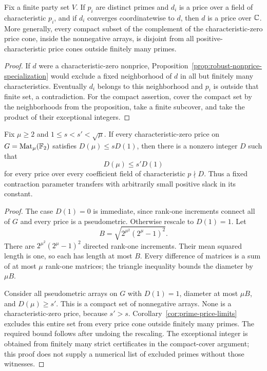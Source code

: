 \begin{corollary}
\label{cor:prime-price-limits}
Fix a finite party set $V$. If $p_i$ are distinct primes and
$d_i$ is a price over a field of characteristic $p_i$, and if
$d_i$ converges coordinatewise to $d$, then $d$ is a price over
$\mathbb C$. More generally, every compact subset of the complement of
the characteristic-zero price cone, inside the nonnegative arrays,
is disjoint from all positive-characteristic price cones outside
finitely many primes.
\end{corollary}

\begin{proof}
If $d$ were a characteristic-zero nonprice,
Proposition~\ref{prop:robust-nonprice-specialization} would exclude
a fixed neighborhood of $d$ in all but finitely many
characteristics. Eventually $d_i$ belongs to this neighborhood
and $p_i$ is outside that finite set, a contradiction.
For the compact assertion, cover the compact set by the
neighborhoods from the proposition, take a finite subcover,
and take the product of their exceptional integers.
\end{proof}

\begin{corollary}
\label{cor:contraction-specializes}
Fix $\mu\ge2$ and $1\le s<s'<\sqrt\mu$.
If every characteristic-zero price on
$G=\operatorname{Mat}_{\mu}(\mathbb F_2)$ satisfies
$D(\mu)\le sD(1)$, then there is a nonzero integer $D$ such that
\[
 D(\mu)\le s'D(1)
\]
for every price over every coefficient field of characteristic
$p\nmid D$. Thus a fixed contraction parameter transfers with
arbitrarily small positive slack in its constant.
\end{corollary}

\begin{proof}
The case $D(1)=0$ is immediate, since rank-one increments connect
all of $G$ and every price is a pseudometric. Otherwise rescale to
$D(1)=1$. Let
\[
 B=\sqrt{2^{\mu^2}(2^\mu-1)^2}.
\]
There are $2^{\mu^2}(2^\mu-1)^2$ directed rank-one increments.
Their mean squared length is one, so each has length at most $B$.
Every difference of matrices is a sum of at most $\mu$ rank-one
matrices; the triangle inequality bounds the diameter by $\mu B$.

Consider all pseudometric arrays on $G$ with $D(1)=1$, diameter
at most $\mu B$, and $D(\mu)\ge s'$.
This is a compact set of nonnegative arrays. None is a
characteristic-zero price, because $s'>s$.
Corollary~\ref{cor:prime-price-limits} excludes this entire set
from every price cone outside finitely many primes.
The required bound follows after undoing the rescaling.
The exceptional integer is obtained from finitely many strict
certificates in the compact-cover argument; this proof does not
supply a numerical list of excluded primes without those witnesses.
\end{proof}

